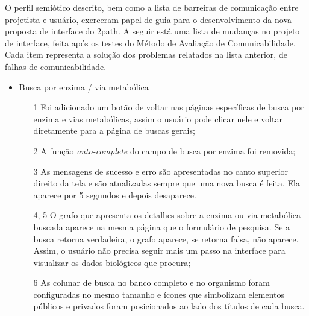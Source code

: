 \indent O perfil semiótico descrito, bem como a lista de barreiras de comunicação entre projetista e usuário, exerceram papel de guia para o desenvolvimento da nova proposta de interface do 2path. A seguir está uma lista de mudanças no projeto de interface, feita após os testes do Método de Avaliação de Comunicabilidade. Cada item representa a solução dos problemas relatados na lista anterior, de falhas de comunicabilidade.

\begin{itemize}
\item Busca por enzima / via metabólica
  \begin{itemize}
  \item[1] Foi adicionado um botão de voltar nas páginas específicas de busca por enzima e vias metabólicas, assim o usuário pode clicar nele e voltar diretamente para a página de buscas gerais;
  \item[2] A função \textit{auto-complete} do campo de busca por enzima foi removida;
  \item[3] As mensagens de sucesso e erro são apresentadas no canto superior direito da tela e são atualizadas sempre que uma nova busca é feita. Ela aparece por 5 segundos e depois desaparece.
  \item[4, 5] O grafo que apresenta os detalhes sobre a enzima ou via metabólica buscada aparece na mesma página que o formulário de pesquisa. Se a busca retorna verdadeira, o grafo aparece, se retorna falsa, não aparece. Assim, o usuário não precisa seguir mais um passo na interface para visualizar os dados biológicos que procura;
  \item[6] As colunar de busca no banco completo e no organismo foram configuradas no mesmo tamanho e ícones que simbolizam elementos públicos e privados foram posicionados ao lado dos títulos de cada busca.
  \end{itemize}
  

\end{itemize}

